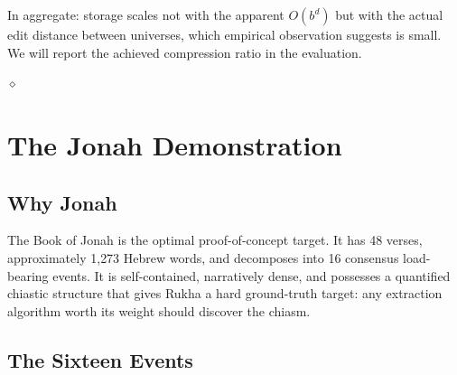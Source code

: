 \documentclass[11pt]{article}
\theoremstyle{rukha}
\newcommand{\diamondrule}{%
  \begin{center}\vspace{0.6em}%
  {\scriptsize $\diamond$}\vspace{0.6em}\end{center}}
\begin{document}
In aggregate: storage scales not with the apparent
$O(b^d)$ but with the actual edit distance between universes, which
empirical observation suggests is small. We will report the achieved
compression ratio in the evaluation.

\diamondrule

\section{The Jonah Demonstration}

\subsection{Why Jonah}

The Book of Jonah is the optimal proof-of-concept target. It has 48
verses, approximately 1{,}273 Hebrew words, and decomposes into 16
consensus load-bearing events. It is self-contained, narratively dense,
and possesses a quantified chiastic structure that gives Rukha a hard
ground-truth target: any extraction algorithm worth its weight should
discover the chiasm.

\subsection{The Sixteen Events}
\end{document}

